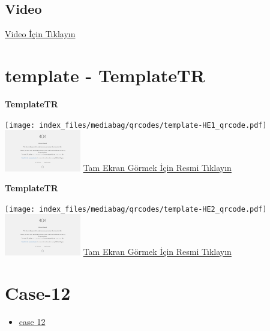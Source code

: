 \documentclass[
  letterpaper,
  DIV=11,
  numbers=noendperiod]{scrreprt}
\providecommand{\tightlist}{%
  \setlength{\itemsep}{0pt}\setlength{\parskip}{0pt}}\usepackage{longtable,booktabs,array}
\begin{document}
\hypertarget{video-10}{%
\subsection{Video}\label{video-10}}

\href{https://www.youtube.com/watch?v=A5XO1Kp11Zk}{Video İçin Tıklayın}

\hypertarget{sec-template}{%
\section{template - TemplateTR}\label{sec-template}}

\textbf{TemplateTR}

\texttt{[image: index\_files/mediabag/qrcodes/template-HE1\_qrcode.pdf]}
\href{https://images.patolojiatlasi.com/template/HE1.html}{\includegraphics[width=0.25\textwidth,height=\textheight]{./screenshots/thumbnail_template-HE1.png}}
\href{https://images.patolojiatlasi.com/template/HE1.html}{Tam Ekran
Görmek İçin Resmi Tıklayın}

\textbf{TemplateTR}

\texttt{[image: index\_files/mediabag/qrcodes/template-HE2\_qrcode.pdf]}
\href{https://images.patolojiatlasi.com/template/HE2.html}{\includegraphics[width=0.25\textwidth,height=\textheight]{./screenshots/thumbnail_template-HE2.png}}
\href{https://images.patolojiatlasi.com/template/HE2.html}{Tam Ekran
Görmek İçin Resmi Tıklayın}

\hypertarget{sec-hacettepe-case-of-the-month-case-12}{%
\section{Case-12}\label{sec-hacettepe-case-of-the-month-case-12}}

\begin{itemize}
\tightlist
\item
  \href{https://www.youtube.com/watch?v=2TwT4sE9XmM&ab_channel=KemalKosemehmetoglu}{case
  12}
\end{itemize}
\end{document}
